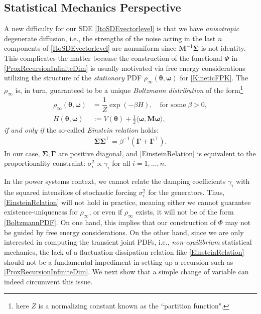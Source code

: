 \documentclass[10pt,twocolumn]{IEEEtran}
\begin{document}
\subsection{Statistical Mechanics Perspective}
A new difficulty for our SDE \eqref{ItoSDEvectorlevel} is that we have \emph{anisotropic} degenerate diffusion, i.e., the strengths of the noise acting in the last $n$ components of \eqref{ItoSDEvectorlevel} are nonuniform since $\bm{M}^{-1}\bm{\Sigma}$ is not identity. This complicates the matter because the construction of the functional $\Phi$ in \eqref{ProxRecursionInfiniteDim} is usually motivated via free energy considerations utilizing the structure of the \emph{stationary} PDF $\rho_{\infty}(\bm{\theta},\bm{\omega})$ for \eqref{KineticFPK}. The $\rho_{\infty}$ is, in turn, guaranteed to be a unique \emph{Boltzmann distribution} of the form\footnote{here $Z$ is a normalizing constant known as the ``partition function".}
\begin{subequations}
\begin{align}
\rho_{\infty}\left(\bm{\theta},\bm{\omega}\right) &= \dfrac{1}{Z}\exp\left(-\beta H\right), \quad\text{for some}\;\beta > 0,\\
H(\bm{\theta},\bm{\omega}) &:= V(\bm{\theta}) + \frac{1}{2}\langle\bm{\omega},\bm{M\omega}\rangle,	
\end{align}	
\label{BoltzmannPDF}
\end{subequations}
\emph{if and only if} the so-called \emph{Einstein relation} \cite{hernandez1989equilibrium,chen2015fast} holds:
\begin{align}
\bm{\Sigma}\bm{\Sigma}^{\top} = \beta^{-1}\left(\bm{\Gamma} + \bm{\Gamma}^{\top}\right).
\label{EinsteinRelation}	
\end{align}
In our case, $\bm{\Sigma,\Gamma}$ are positive diagonal, and \eqref{EinsteinRelation} is equivalent to the proportionality constraint: $\sigma_{i}^{2} \propto \gamma_{i}$ for all $i=1,\hdots,n$.

In the power systems context, we cannot relate the damping coefficients $\gamma_i$ with the squared intensities of stochastic forcing $\sigma_{i}^{2}$ for the generators. Thus, \eqref{EinsteinRelation} will not hold in practice, meaning either we cannot guarantee existence-uniqueness for $\rho_{\infty}$, or even if $\rho_{\infty}$ exists, it will not be of the form \eqref{BoltzmannPDF}. On one hand, this implies that our construction of $\Phi$ may not be guided by free energy considerations. On the other hand, since we are only interested in computing the transient joint PDFs, i.e., \emph{non-equilibrium} statistical mechanics, the lack of a fluctuation-dissipation relation like \eqref{EinsteinRelation} should not be a fundamental impediment in setting up a recursion such as \eqref{ProxRecursionInfiniteDim}. We next show that a simple change of variable can indeed circumvent this issue. 
\end{document}

